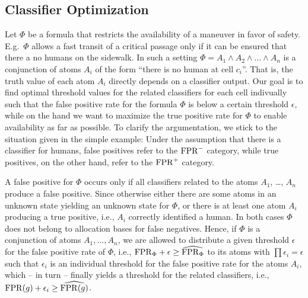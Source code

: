 \subsection{Classifier Optimization}
Let $\Phi$ be a formula that restricts the availability of a maneuver in favor of safety. 
E.g.\ $\Phi$ allows a fast transit of a critical passage only if it can be ensured that there a no humans on the sidewalk. In such a setting $\Phi = A_1 \land A_2 \land \dots \land A_n$ is a conjunction of atoms $A_i$ of the form ``there is no human at cell $c_i$''. That is, the truth value of each atom $A_i$ directly depends on a classifier output. Our goal is to find optimal threshold values for the related classifiers for each cell indivually such that the false positive rate for the formula $\Phi$ is below a certain threshold $\epsilon$, while on the hand we want to maximize the true positive rate for $\Phi$ to enable availability as far as possible.
To clarify the argumentation, we stick to the situation given in the simple example: Under the assumption that there is a classifier for humans, false positives refer to the $\mathrm{FPR}^-$ category, while true positives, on the other hand, refer to the $\mathrm{FPR}^+$ category.

A false positive for $\Phi$ occurs only if all classifiers related to the atoms 
$A_1$, \dots, $A_n$ produce a false positive. Since otherwise either there are some atoms in an unknown state yielding an unknown state for $\Phi$, or there is at least
one atom $A_i$ producing a true positive, i.e., $A_i$ correctly identified a human. In both cases $\Phi$ does not belong to allocation bases for false negatives.%
Hence, if $\Phi$ is a conjunction of atoms $A_1,\dots,A_n$, we are allowed to distribute a given threshold $\epsilon$ for the false positive rate of $\Phi$, i.e., $\mathrm{FPR}_\Phi+\epsilon\geq\widehat{\mathrm{FPR}_\Phi}$ to its atoms with 
$\prod\epsilon_i = \epsilon$ such that $\epsilon_i$ is an individual threshold for the false positive rate for the atoms $A_i$, which -- in turn -- finally yields a threshold for the related classifiers, i.e., $\mathrm{FPR}(g)+\epsilon_i \geq  \widehat{\mathrm{FPR}(g)}$.







